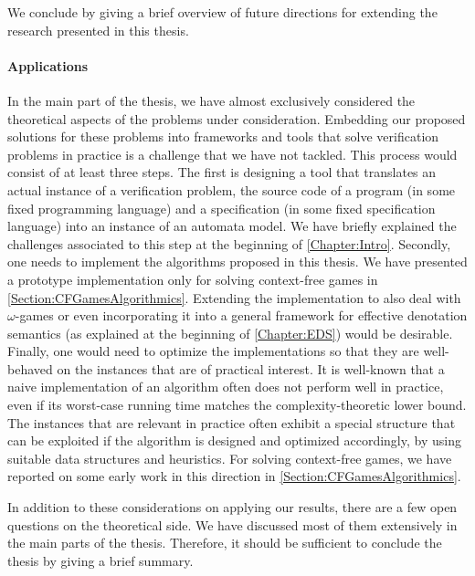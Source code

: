 \documentclass[../../diss.tex]{subfiles}
\begin{document}

We conclude by giving a brief overview of future directions for extending the research presented in this thesis.

\paragraph{Applications}

In the main part of the thesis, we have almost exclusively considered the theoretical aspects of the problems under consideration.
Embedding our proposed solutions for these problems into frameworks and tools that solve verification problems in practice is a challenge that we have not tackled.
This process would consist of at least three steps.
The first is designing a tool that translates an actual instance of a verification problem, \eg the source code of a program (in some fixed programming language) and a specification (in some fixed specification language) into an instance of an automata model.
We have briefly explained the challenges associated to this step at the beginning of \cref{Chapter:Intro}.
Secondly, one needs to implement the algorithms proposed in this thesis.
We have presented a prototype implementation only for solving context-free games in \cref{Section:CFGamesAlgorithmics}.
Extending the implementation to also deal with $\omega$-games or even incorporating it into a general framework for effective denotation semantics (as explained at the beginning of \cref{Chapter:EDS}) would be desirable.
Finally, one would need to optimize the implementations so that they are well-behaved on the instances that are of practical interest.
It is well-known that a naive implementation of an algorithm often does not perform well in practice, even if its worst-case running time matches the complexity-theoretic lower bound.
The instances that are relevant in practice often exhibit a special structure that can be exploited if the algorithm is designed and optimized accordingly, \eg by using suitable data structures and heuristics.
For solving context-free games, we have reported on some early work in this direction in \cref{Section:CFGamesAlgorithmics}.

In addition to these considerations on applying our results, there are a few open questions on the theoretical side.
We have discussed most of them extensively in the main parts of the thesis.
Therefore, it should be sufficient to conclude the thesis by giving a brief summary.
\end{document}
